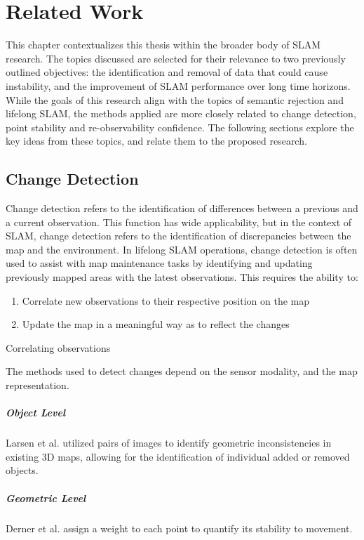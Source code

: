 \section{Related Work}
\label{sec:related_work}

This chapter contextualizes this thesis within the broader body of SLAM research. The topics discussed are selected for their relevance to two previously outlined objectives: the identification and removal of data that could cause instability, and the improvement of SLAM performance over long time horizons. While the goals of this research align with the topics of semantic rejection and lifelong SLAM, the methods applied are more closely related to change detection, point stability and re-observability confidence. The following sections explore the key ideas from these topics, and relate them to the proposed research.

\subsection{Change Detection}

Change detection refers to the identification of differences between a previous and a current observation. This function has wide applicability, but in the context of SLAM, change detection refers to the identification of discrepancies between the map and the environment. In lifelong SLAM operations, change detection is often used to assist with map maintenance tasks by identifying and updating previously mapped areas with the latest observations. This requires the ability to:
\begin{enumerate}
    \item Correlate new observations to their respective position on the map
    \item Update the map in a meaningful way as to reflect the changes
\end{enumerate}
Correlating observations 

The methods used to detect changes depend on the sensor modality, and the map representation. 

\subparagraph{Object Level}
Larsen et al. \cite{larsenChangeDetectionModel} utilized pairs of images to identify geometric inconsistencies in existing 3D maps, allowing for the identification of individual added or removed objects.

\subparagraph{Geometric Level}
Derner et al. \cite{dernerChangeDetectionUsing2021} assign a weight to each point to quantify its stability to movement.




